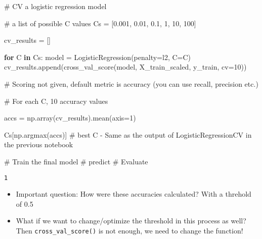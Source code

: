 \documentclass[
  letterpaper,
  DIV=11,
  numbers=noendperiod]{scrreprt}
\newenvironment{Shaded}{\begin{snugshade}}{\end{snugshade}}
\newcommand{\CommentTok}[1]{\textcolor[rgb]{0.37,0.37,0.37}{#1}}
\newcommand{\ControlFlowTok}[1]{\textcolor[rgb]{0.00,0.23,0.31}{\textbf{#1}}}
\newcommand{\DecValTok}[1]{\textcolor[rgb]{0.68,0.00,0.00}{#1}}
\newcommand{\FloatTok}[1]{\textcolor[rgb]{0.68,0.00,0.00}{#1}}
\newcommand{\KeywordTok}[1]{\textcolor[rgb]{0.00,0.23,0.31}{\textbf{#1}}}
\newcommand{\NormalTok}[1]{\textcolor[rgb]{0.00,0.23,0.31}{#1}}
\newcommand{\OperatorTok}[1]{\textcolor[rgb]{0.37,0.37,0.37}{#1}}
\newcommand{\StringTok}[1]{\textcolor[rgb]{0.13,0.47,0.30}{#1}}
\providecommand{\tightlist}{%
  \setlength{\itemsep}{0pt}\setlength{\parskip}{0pt}}\usepackage{longtable,booktabs,array}
\begin{document}
\begin{Shaded}
\begin{Highlighting}[]
\CommentTok{\# CV a logistic regression model}

\CommentTok{\# a list of possible C values}
\NormalTok{Cs }\OperatorTok{=}\NormalTok{ [}\FloatTok{0.001}\NormalTok{, }\FloatTok{0.01}\NormalTok{, }\FloatTok{0.1}\NormalTok{, }\DecValTok{1}\NormalTok{, }\DecValTok{10}\NormalTok{, }\DecValTok{100}\NormalTok{]}

\NormalTok{cv\_results }\OperatorTok{=}\NormalTok{ []}

\ControlFlowTok{for}\NormalTok{ C }\KeywordTok{in}\NormalTok{ Cs:}
\NormalTok{    model }\OperatorTok{=}\NormalTok{ LogisticRegression(penalty}\OperatorTok{=}\StringTok{\textquotesingle{}l2\textquotesingle{}}\NormalTok{, C}\OperatorTok{=}\NormalTok{C)}
\NormalTok{    cv\_results.append(cross\_val\_score(model, X\_train\_scaled, y\_train, cv}\OperatorTok{=}\DecValTok{10}\NormalTok{))}

\CommentTok{\# Scoring not given, default metric is accuracy (you can use recall, precision etc.)}
\end{Highlighting}
\end{Shaded}

\begin{Shaded}
\begin{Highlighting}[]
\CommentTok{\# For each C, 10 accuracy values}

\NormalTok{accs }\OperatorTok{=}\NormalTok{ np.array(cv\_results).mean(axis}\OperatorTok{=}\DecValTok{1}\NormalTok{)}

\NormalTok{Cs[np.argmax(accs)] }\CommentTok{\# best C {-} Same as the output of LogisticRegressionCV in the previous notebook}

\CommentTok{\# Train the final model}
\CommentTok{\# predict}
\CommentTok{\# Evaluate}
\end{Highlighting}
\end{Shaded}

\begin{verbatim}
1
\end{verbatim}

\begin{itemize}
\tightlist
\item
  Important question: How were these accuracies calculated? With a
  threhold of 0.5
\item
  What if we want to change/optimize the threshold in this process as
  well? Then \texttt{cross\_val\_score()} is not enough, we need to
  change the function!
\end{itemize}
\end{document}
